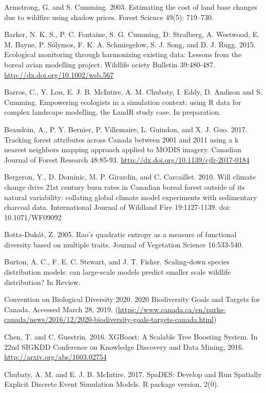 \documentclass[]{article}
\begin{document}
Armstrong, G. and S. Cumming. 2003. Estimating the cost of land base
changes due to wildfire using shadow prices. Forest Science 49(5):
719--730.

Barker, N. K. S., P. C. Fontaine, S. G. Cumming, D. Stralberg, A.
Westwood, E. M. Bayne, P. Sólymos, F. K. A. Schmiegelow, S. J. Song, and
D. J. Rugg. 2015. Ecological monitoring through harmonizing existing
data: Lessons from the boreal avian modelling project. Wildlife ociety
Bulletin 39:480-487. \url{http://dx.doi.org/10.1002/wsb.567}

Barros, C., Y. Lou, E. J. B. McIntire, A. M. Chubaty, I. Eddy, D.
Andison and S. Cumming. Empowering ecologists in a simulation context:
using R data for complex landscape modelling, the LandR study case. In
preparation.

Beaudoin, A., P. Y. Bernier, P. Villemaire, L. Guindon, and X. J. Guo.
2017. Tracking forest attributes across Canada between 2001 and 2011
using a k nearest neighbors mapping approach applied to MODIS imagery.
Canadian Journal of Forest Research 48:85-93.
\url{http://dx.doi.org/10.1139/cjfr-2017-0184}

Bergeron, Y., D. Dominic, M. P. Girardin, and C. Carcaillet. 2010. Will
climate change drive 21st century burn rates in Canadian boreal forest
outside of its natural variability: collating global climate model
experiments with sedimentary charcoal data. International Journal of
Wildland Fire 19:1127-1139. doi: 10.1071/WF09092

Botta-Dukát, Z. 2005. Rao's quadratic entropy as a measure of functional
diversity based on multiple traits. Journal of Vegetation Science
16:533-540.

Burton, A. C., F. E. C. Stewart, and J. T. Fisher. Scaling-down species
distribution models: can large-scale models predict smaller scale
wildlife distribution? In Review.

Convention on Biological Diversity 2020. 2020 Biodiversity Goals and
Targets for Canada. Accessed March 28, 2019.
(\url{https://www.canada.ca/en/parks-canada/news/2016/12/2020-biodiversity-goals-targets-canada.html})

Chen, T. and C. Guestrin. 2016. XGBoost: A Scalable Tree Boosting
System. In 22nd SIGKDD Conference on Knowledge Discovery and Data
Mining, 2016. \url{http://arxiv.org/abs/1603.02754}

Chubaty, A. M. and E. J. B. McIntire. 2017. SpaDES: Develop and Run
Spatially Explicit Discrete Event Simulation Models. R package version,
2(0).
\end{document}
